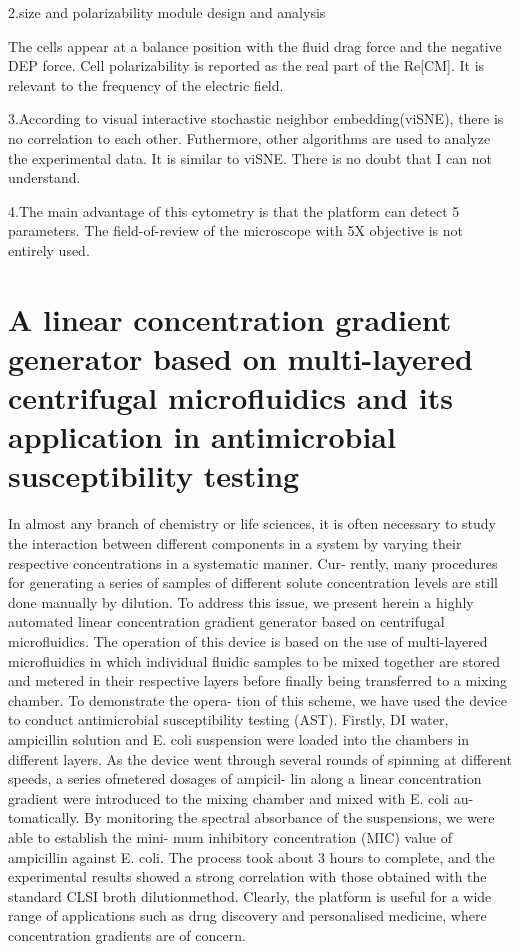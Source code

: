 \documentclass{article}
\begin{document}
2.size and polarizability module design and analysis

The cells appear at a balance position with the fluid drag force and the negative DEP force. Cell polarizability is reported as the real part of the Re[CM]. It is relevant to the frequency of the electric field.

3.According to visual interactive stochastic neighbor embedding(viSNE), there is no correlation to each other. Futhermore, other algorithms are used to analyze the experimental data. It is similar to viSNE. There is no doubt that I can not understand.

4.The main advantage of this cytometry is that the platform can detect 5 parameters.
The  field-of-review of the microscope with 5X objective is not entirely used.  

\part{A linear concentration gradient generator based on multi-layered centrifugal microfluidics and its application in antimicrobial susceptibility testing}

In almost any branch of chemistry or life sciences, it is often necessary to study the interaction between different components in a system by varying their respective concentrations in a systematic manner. Cur- rently, many procedures for generating a series of samples of different solute concentration levels are still done manually by dilution. To address this issue, we present herein a highly automated linear concentration gradient generator based on centrifugal microfluidics. The operation of this device is based on the use of multi-layered microfluidics in which individual fluidic samples to be mixed together are stored and metered in their respective layers before finally being transferred to a mixing chamber. To demonstrate the opera- tion of this scheme, we have used the device to conduct antimicrobial susceptibility testing (AST). Firstly, DI water, ampicillin solution and E. coli suspension were loaded into the chambers in different layers. As the device went through several rounds of spinning at different speeds, a series ofmetered dosages of ampicil- lin along a linear concentration gradient were introduced to the mixing chamber and mixed with E. coli au- tomatically. By monitoring the spectral absorbance of the suspensions, we were able to establish the mini- mum inhibitory concentration (MIC) value of ampicillin against E. coli. The process took about 3 hours to complete, and the experimental results showed a strong correlation with those obtained with the standard CLSI broth dilutionmethod. Clearly, the platform is useful for a wide range of applications such as drug discovery and personalised medicine, where concentration gradients are of concern.
\end{document}
